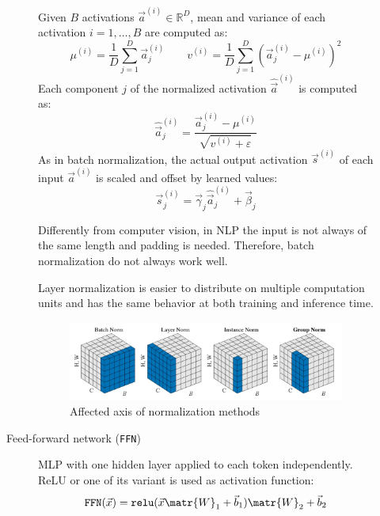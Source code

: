 \begin{description}
\begin{description}
                Given $B$ activations $\vec{a}^{(i)} \in \mathbb{R}^{D}$, mean and variance of each activation $i=1, \dots, B$ are computed as:
                \[ \mu^{(i)} = \frac{1}{D} \sum_{j=1}^{D} \vec{a}^{(i)}_{j} \qquad v^{(i)} = \frac{1}{D} \sum_{j=1}^{D} \left( \vec{a}^{(i)}_j - \mu^{(i)} \right)^2 \]
                Each component $j$ of the normalized activation $\hat{\vec{a}}^{(i)}$ is computed as:
                \[ \hat{\vec{a}}^{(i)}_{j} = \frac{\vec{a}^{(i)}_j - \mu^{(i)}}{\sqrt{v^{(i)} + \varepsilon}} \]
                As in batch normalization, the actual output activation $\vec{s}^{(i)}$ of each input $\vec{a}^{(i)}$ is scaled and offset by learned values:
                \[ \vec{s}^{(i)}_j = \vec{\gamma}_j \hat{\vec{a}}^{(i)}_j + \vec{\beta}_j \]

                \begin{remark}
                    Differently from computer vision, in NLP the input is not always of the same length and padding is needed. Therefore, batch normalization do not always work well.
                \end{remark}

                \begin{remark}
                    Layer normalization is easier to distribute on multiple computation units and has the same behavior at both training and inference time.
                \end{remark}

                \begin{figure}[H]
                    \centering
                    \includegraphics[width=0.8\linewidth]{./img/norm_methods.jpg}
                    \caption{Affected axis of normalization methods}
                \end{figure}

            \item[Feed-forward network (\texttt{FFN})] 
                MLP with one hidden layer applied to each token independently. ReLU or one of its variant is used as activation function:
                \[ \texttt{FFN}(\vec{x}) = \texttt{relu}(\vec{x}\matr{W}_1 + \vec{b}_1)\matr{W}_2 + \vec{b}_2 \]


\end{description}
\end{description}
